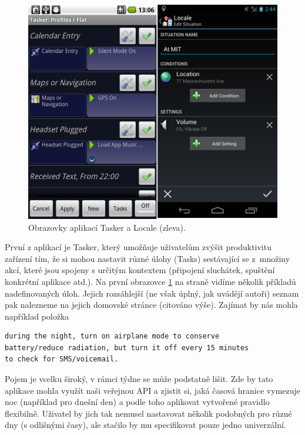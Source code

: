 \documentclass[thesis=M,czech]{FITthesis}[2012/06/26]
\begin{document}
\begin{figure}\centering
	\includegraphics[width=1\textwidth]{figures/similar_apps}
	\caption{Obrazovky aplikací Tasker\cite{tasker} a Locale\cite{locale} (zleva).}
	\label{fig:similar_apps}
\end{figure}

První z aplikací je Tasker\cite{tasker}, který umožňuje uživatelům zvýšit produktivitu zařízení tím, že si mohou nastavit různé úlohy (Tasks) sestávající se z~množiny akcí, které jsou spojeny s určitým kontextem (připojení sluchátek, spuštění konkrétní aplikace atd.). Na první obrazovce \ref{fig:similar_apps} na straně \pageref{fig:similar_apps} vidíme několik příkladů nadefinovaných úloh. Jejich rozsáhlejší (ne však úplný, jak uvádějí autoři) seznam pak nalezneme na jejich domovské stránce (citováno výše). Zajímat by nás mohla například položka

\begin{verbatim}
during the night, turn on airplane mode to conserve 
battery/reduce radiation, but turn it off every 15 minutes 
to check for SMS/voicemail.
\end{verbatim}

Pojem  je vcelku široký, v rámci týdne se může podstatně lišit. Zde by tato aplikace mohla využít naši veřejnou API a zjistit si, jaká časová hranice vymezuje noc (například pro dnešní den) a podle toho aplikovat vytvořené pravidlo flexibilně. Uživatel by jich tak nemusel nastavovat několik podobných pro různé dny (s odlišnými časy), ale stačilo by mu specifikovat pouze jedno univerzální.
\end{document}
